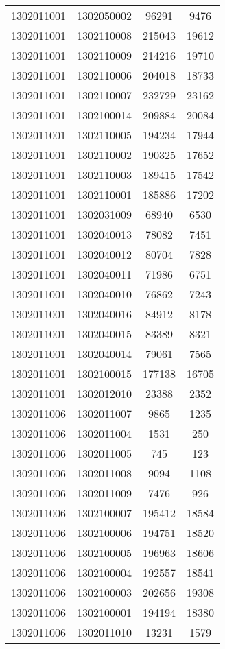 \begin{longtable}{llcc}
1302011001 & 1302050002 & 96291 & 9476\\
1302011001 & 1302110008 & 215043 & 19612\\
1302011001 & 1302110009 & 214216 & 19710\\
1302011001 & 1302110006 & 204018 & 18733\\
1302011001 & 1302110007 & 232729 & 23162\\
1302011001 & 1302100014 & 209884 & 20084\\
1302011001 & 1302110005 & 194234 & 17944\\
1302011001 & 1302110002 & 190325 & 17652\\
1302011001 & 1302110003 & 189415 & 17542\\
1302011001 & 1302110001 & 185886 & 17202\\
1302011001 & 1302031009 & 68940 & 6530\\
1302011001 & 1302040013 & 78082 & 7451\\
1302011001 & 1302040012 & 80704 & 7828\\
1302011001 & 1302040011 & 71986 & 6751\\
1302011001 & 1302040010 & 76862 & 7243\\
1302011001 & 1302040016 & 84912 & 8178\\
1302011001 & 1302040015 & 83389 & 8321\\
1302011001 & 1302040014 & 79061 & 7565\\
1302011001 & 1302100015 & 177138 & 16705\\
1302011001 & 1302012010 & 23388 & 2352\\
1302011006 & 1302011007 & 9865 & 1235\\
1302011006 & 1302011004 & 1531 & 250\\
1302011006 & 1302011005 & 745 & 123\\
1302011006 & 1302011008 & 9094 & 1108\\
1302011006 & 1302011009 & 7476 & 926\\
1302011006 & 1302100007 & 195412 & 18584\\
1302011006 & 1302100006 & 194751 & 18520\\
1302011006 & 1302100005 & 196963 & 18606\\
1302011006 & 1302100004 & 192557 & 18541\\
1302011006 & 1302100003 & 202656 & 19308\\
1302011006 & 1302100001 & 194194 & 18380\\
1302011006 & 1302011010 & 13231 & 1579\\

\end{longtable}
